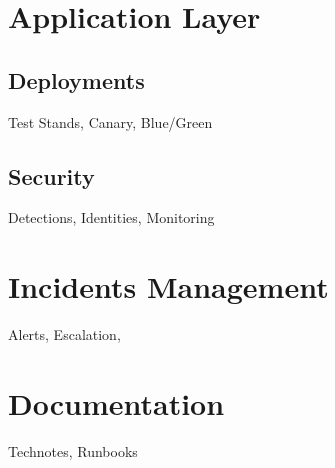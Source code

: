 \section{Application Layer}

\subsection{Deployments}
Test Stands, Canary, Blue/Green

\subsection{Security}
Detections, Identities, Monitoring

\section{Incidents Management}
Alerts, Escalation, 

\section{Documentation}
Technotes, Runbooks

